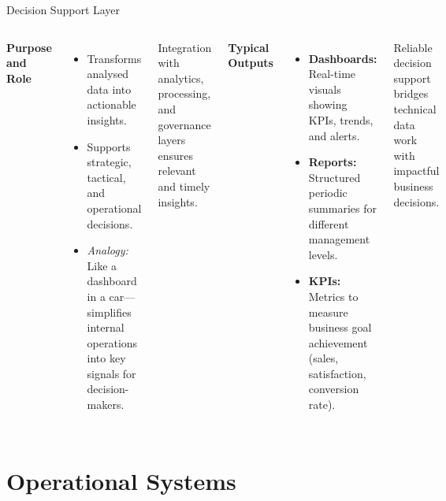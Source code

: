 \documentclass[aspectratio=169, table]{beamer}
\begin{document}
	\begin{frame}[fragile]{Decision Support Layer}
		\vspace{20pt}
		\begin{columns}[T,onlytextwidth]
			\textbf{Purpose and Role}
			\begin{itemize}
				\item Transforms analysed data into actionable insights.
				\item Supports strategic, tactical, and operational decisions.
				\item \textit{Analogy:} Like a dashboard in a car—simplifies internal operations into key signals for decision-makers.
			\end{itemize}
			Integration with analytics, processing, and governance layers ensures relevant and timely insights.
			
			\textbf{Typical Outputs}
			\begin{itemize}
				\item \textbf{Dashboards:} Real-time visuals showing KPIs, trends, and alerts.
				\item \textbf{Reports:} Structured periodic summaries for different management levels.
				\item \textbf{KPIs:} Metrics to measure business goal achievement (sales, satisfaction, conversion rate).
			\end{itemize}
			Reliable decision support bridges technical data work with impactful business decisions.
		\end{columns}
	\end{frame}
	
	\section{Operational Systems}
	
\end{document}
